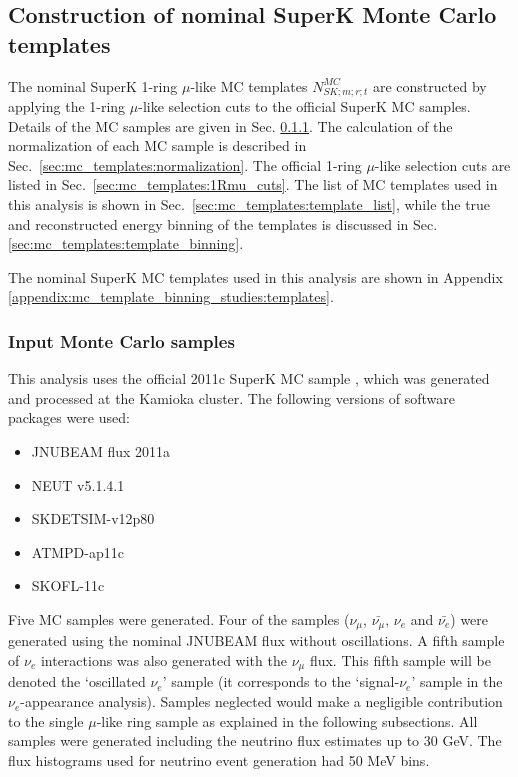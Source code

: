 
\subsection {Construction of nominal SuperK Monte Carlo templates}
\label{sec:mc_templates}

The nominal SuperK 1-ring $\mu$-like MC templates $N_{SK;m;r;t}^{MC}$
are constructed by applying the 1-ring $\mu$-like selection cuts to the official SuperK MC samples.
Details of the MC samples are given in Sec. \ref{sec:mc_templates:input_mc}.
The calculation of the normalization of each MC sample is described in Sec.\ \ref{sec:mc_templates:normalization}.
The official 1-ring $\mu$-like selection cuts are listed in Sec.\ \ref{sec:mc_templates:1Rmu_cuts}.
The list of MC templates used in this analysis is shown in Sec.\ \ref{sec:mc_templates:template_list},
while the true and reconstructed energy binning of the templates is discussed 
in Sec. \ref{sec:mc_templates:template_binning}.

The nominal SuperK MC templates used in this analysis are shown in Appendix \ref{appendix:mc_template_binning_studies:templates}.

\subsubsection {Input Monte Carlo samples}
\label{sec:mc_templates:input_mc}

This analysis uses the official 2011c SuperK MC sample \cite{SKsample},
which was generated and processed at the Kamioka cluster.
The following versions of software packages were used:
\begin{itemize}
  \item JNUBEAM flux 2011a
  \item NEUT v5.1.4.1
  \item SKDETSIM-v12p80
  \item ATMPD-ap11c
  \item SKOFL-11c
\end{itemize}

Five MC samples were generated.
Four of the samples
($\nu_{\mu}$, $\bar{\nu_{\mu}}$, $\nu_{e}$ and $\bar{\nu_{e}}$) 
were generated using the nominal JNUBEAM flux without oscillations.
A fifth sample of $\nu_{e}$ interactions was also generated with the $\nu_{\mu}$ flux.
This fifth sample will be denoted the `oscillated $\nu_{e}$' sample (it corresponds to the `signal-$\nu_{e}$' 
sample in the $\nu_{e}$-appearance analysis).
Samples neglected would make a negligible contribution to the single $\mu$-like ring sample as explained in 
the following subsections.
All samples were generated including the neutrino flux estimates up to 30 GeV.
The flux histograms used for neutrino event generation had 50 MeV bins.

